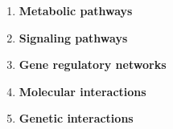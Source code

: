 \begin{frame}
\begin{enumerate}
\item \textbf{Metabolic pathways}
\item \textbf{Signaling pathways}
\item \textbf{Gene regulatory networks}
\item \textbf{Molecular interactions}
\item \textbf{Genetic interactions}
\end{enumerate}
\end{frame}
